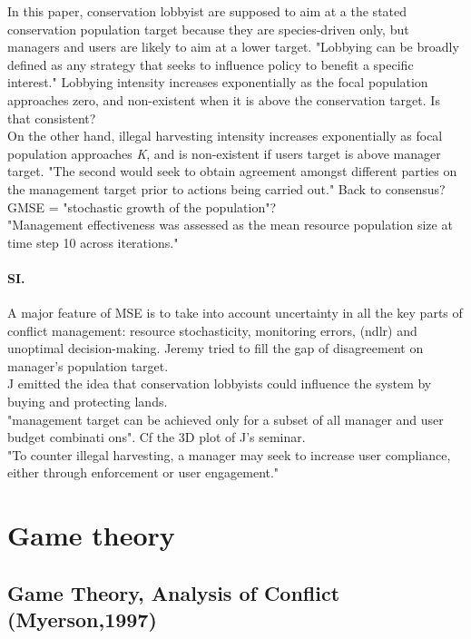 \documentclass[12pt]{article}
\begin{document}
In this paper, conservation lobbyist are supposed to aim at a the stated conservation population target because they are species-driven only, but managers and users are likely to aim at a lower target.
"Lobbying  can  be  broadly  defined  as  any  strategy  that  seeks  to  influence  policy  to benefit   a   specific   interest."
Lobbying intensity increases exponentially as the focal population approaches zero, and non-existent when it is above the conservation target. Is that consistent?\\
On the other hand, illegal harvesting intensity increases exponentially as focal population approaches \textit{K}, and is non-existent if users target is above manager target.
"The  second  would  seek  to  obtain  agreement  amongst different parties on the management target prior to actions being carried out." Back to consensus?\\
GMSE = "stochastic growth of the population"?\\
"Management effectiveness was assessed as the mean resource population size at time step 10 across iterations."

\paragraph{SI.} A major feature of MSE is to take into account uncertainty in all the key parts of conflict management: resource stochasticity, monitoring errors, (ndlr) and unoptimal decision-making. Jeremy tried to fill the gap of disagreement on manager's population target.\\
J emitted the idea that conservation lobbyists could influence the system by buying and protecting lands.\\
"management  target  can  be  achieved 
only 
for 
a  subset
of  all 
manager and user budget 
combinati
ons". Cf the 3D plot of J's seminar.\\
"To  counter  illegal  harvesting,  a  manager  may  seek  to  increase  user  compliance,  either 
through  enforcement  or  user  engagement."\\

\section{Game theory}

\subsection{Game Theory, Analysis of Conflict (Myerson,1997)}
\end{document}

